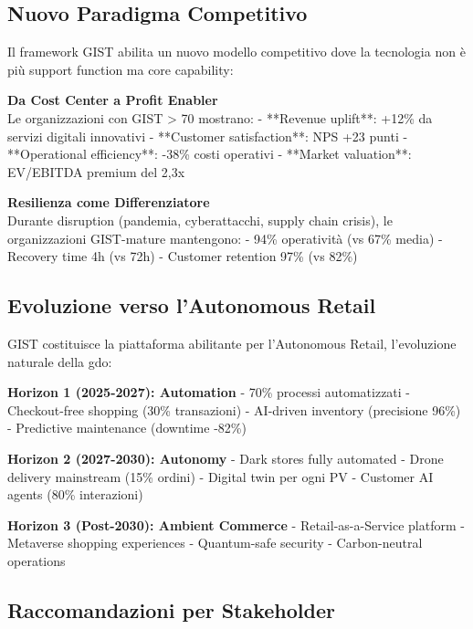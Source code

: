 \subsection{\texorpdfstring{Nuovo Paradigma Competitivo}{5.5.1 - Nuovo Paradigma}}
\label{subsec:5.5.1}

Il framework GIST abilita un nuovo modello competitivo dove la tecnologia non è più support function ma core capability:

\textbf{Da Cost Center a Profit Enabler}\\
Le organizzazioni con GIST > 70 mostrano:
- **Revenue uplift**: +12\% da servizi digitali innovativi
- **Customer satisfaction**: NPS +23 punti
- **Operational efficiency**: -38\% costi operativi
- **Market valuation**: EV/EBITDA premium del 2,3x

\textbf{Resilienza come Differenziatore}\\
Durante disruption (pandemia, cyberattacchi, supply chain crisis), le organizzazioni GIST-mature mantengono:
- 94\% operatività (vs 67\% media)
- Recovery time 4h (vs 72h)
- Customer retention 97\% (vs 82\%)

\subsection{\texorpdfstring{Evoluzione verso l'Autonomous Retail}{5.5.2 - Autonomous Retail}}
\label{subsec:5.5.2}

GIST costituisce la piattaforma abilitante per l'Autonomous Retail, l'evoluzione naturale della \gls{gdo}:

\textbf{Horizon 1 (2025-2027): Automation}
- 70\% processi automatizzati
- Checkout-free shopping (30\% transazioni)
- AI-driven inventory (precisione 96\%)
- Predictive maintenance (downtime -82\%)

\textbf{Horizon 2 (2027-2030): Autonomy}
- Dark stores fully automated
- Drone delivery mainstream (15\% ordini)
- Digital twin per ogni PV
- Customer AI agents (80\% interazioni)

\textbf{Horizon 3 (Post-2030): Ambient Commerce}
- Retail-as-a-Service platform
- Metaverse shopping experiences
- Quantum-safe security
- Carbon-neutral operations

\subsection{\texorpdfstring{Raccomandazioni per Stakeholder}{5.5.3 - Raccomandazioni}}
\label{subsec:5.5.3}

